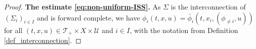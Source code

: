 \documentclass[twocolumn]{IEEEtran} %
\theoremstyle{definition}
\newcommand{\tm}{\times}%
\newcommand{\Uc}{\mathcal{U}}%
\newcommand{\R}{\mathbb{R}}%
\newcommand{\Kinf}{\mathcal{K_\infty}}%
\newcommand{\T}{\ensuremath{\mathcal{T}}}  %
\begin{document}
\begin{proof}
%
%
%
%
\noindent\textbf{The estimate \eqref{eq:non-uniform-ISS}.} 
As $\Sigma$ is the interconnection of $(\Sigma_i)_{i\in I}$ and is forward complete, we have $\phi_i(t,x,u) = \bar{\phi}_i(t,x_i,(\phi_{\neq i},u))$ for all $(t,x,u) \in \T_+ \tm X \tm \Uc$ and $i \in I$, with the notation from Definition \ref{def_interconnection}.%


\end{proof}
\end{document}

